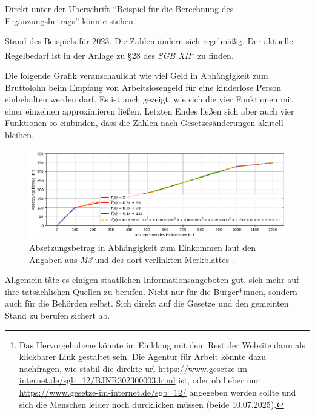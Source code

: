 \begin{myenumerate}
    Direkt unter der Überschrift \enquote{Beispiel für die Berechnung des Ergänzungsbetrags} könnte stehen:


    Stand des Beispiels für 2023. Die Zahlen ändern sich regelmäßig. Der aktuelle Regelbedarf ist in der Anlage zu §28 des \emph{SGB XII}\footnote{
        Das Hervorgehobene könnte im Einklang mit dem Rest der Website dann als klickbarer Link gestaltet sein. Die Agentur für Arbeit könnte dazu nachfragen, wie stabil die direkte \gls{url} \url{https://www.gesetze-im-internet.de/sgb_12/BJNR302300003.html} ist, oder ob lieber nur \url{https://www.gesetze-im-internet.de/sgb_12/} angegeben werden sollte und sich die Menschen leider noch durcklicken müssen (beide 10.07.2025).} zu finden.
\end{myenumerate}

Die folgende Grafik veranschaulicht wie viel Geld in Abhängigkeit zum Bruttolohn beim Empfang von Arbeitslosengeld für eine kinderlose Person einbehalten werden darf. Es ist auch gezeigt, wie sich die vier Funktionen mit einer einzelnen approximieren ließen. Letzten Endes ließen sich aber auch vier Funktionen so einbinden, dass die Zahlen nach Gesetzesänderungen akutell bleiben.
\begin{figure}[h!]
    \centering
    \includegraphics[width=1\linewidth]{Absetzungsbetrag.png}
    \caption{Absetzungsbetrag in Abhängigkeit zum Einkommen laut den Angaben aus \emph{M3} und des dort verlinkten Merkblattes \autocite[59-62]{MerkblattSGBII}.}
    \label{Absetzungsbetrag}
\end{figure}

Allgemein täte es einigen staatlichen Informationsangeboten gut, sich mehr auf ihre tatsächlichen Quellen zu berufen. Nicht nur für die Bürger*innen, sondern auch für die Behörden selbst. Sich direkt auf die Gesetze und den gemeinten Stand zu berufen sichert ab.
\bigskip

